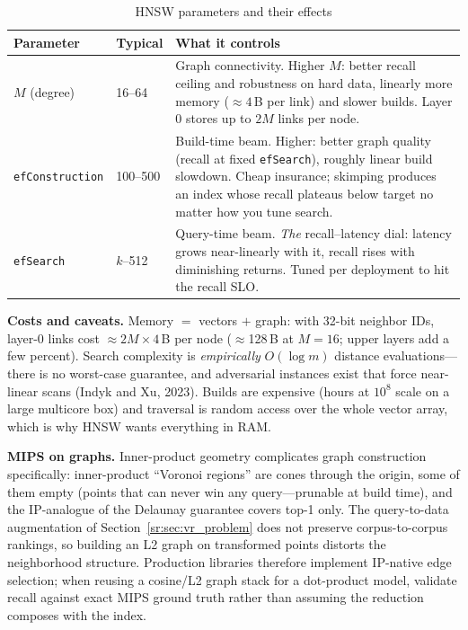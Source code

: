 \begin{table}[H]
\centering
\caption{HNSW parameters and their effects}
\label{sr:tab:hnsw_params}
\begin{tabularx}{\textwidth}{llX}
\toprule
\textbf{Parameter} & \textbf{Typical} & \textbf{What it controls} \\
\midrule
$M$ (degree) & 16--64 & Graph connectivity. Higher $M$: better recall ceiling and robustness on hard data, linearly more memory ($\approx 4$\,B per link) and slower builds. Layer 0 stores up to $2M$ links per node. \\
\texttt{efConstruction} & 100--500 & Build-time beam. Higher: better graph quality (recall at fixed \texttt{efSearch}), roughly linear build slowdown. Cheap insurance; skimping produces an index whose recall plateaus below target no matter how you tune search. \\
\texttt{efSearch} & $k$--512 & Query-time beam. \emph{The} recall--latency dial: latency grows near-linearly with it, recall rises with diminishing returns. Tuned per deployment to hit the recall SLO. \\
\bottomrule
\end{tabularx}
\end{table}

\textbf{Costs and caveats.} Memory $=$ vectors $+$ graph: with 32-bit neighbor IDs, layer-0 links cost $\approx 2M \times 4$\,B per node ($\approx$128\,B at $M{=}16$; upper layers add a few percent). Search complexity is \emph{empirically} $O(\log m)$ distance evaluations---there is no worst-case guarantee, and adversarial instances exist that force near-linear scans (Indyk and Xu, 2023). Builds are expensive (hours at $10^8$ scale on a large multicore box) and traversal is random access over the whole vector array, which is why HNSW wants everything in RAM.

\textbf{MIPS on graphs.} Inner-product geometry complicates graph construction specifically: inner-product ``Voronoi regions'' are cones through the origin, some of them empty (points that can never win any query---prunable at build time), and the IP-analogue of the Delaunay guarantee covers top-1 only. The query-to-data augmentation of Section~\ref{sr:sec:vr_problem} does not preserve corpus-to-corpus rankings, so building an L2 graph on transformed points distorts the neighborhood structure. Production libraries therefore implement IP-native edge selection; when reusing a cosine/L2 graph stack for a dot-product model, validate recall against exact MIPS ground truth rather than assuming the reduction composes with the index.

